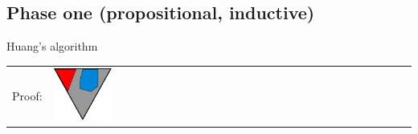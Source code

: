 \documentclass[final,compress]{beamer}
\begin{document}
\subsection{Phase one (propositional, inductive)}
\begin{frame}{Huang's algorithm}
	\small
	\newcommand{\fakemulticolwidth}{0.28\textwidth}
	\newcommand{\proofwidth}{0.17\textwidth}
	\newcommand{\proofindent}{\hspace*{11.21em}}

	\newcommand{\stagearrow}{{\Large$\Downarrow$}}

	\begin{tabular}{p{}ll}

		Proof: 
		&

		\multicolumn{1}{m{\fakemulticolwidth}}{
			\includegraphics[width=\proofwidth]{figures/two_phase_draft_proof}
		}
		&
		\vspace*{0.5em}
		\\


\end{tabular}
\end{frame}
\end{document}
